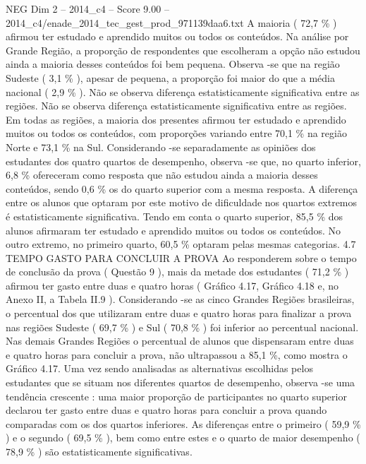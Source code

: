 \begin{textsample}{NEG Dim 2 – 2014\_c4 – Score 9.00 – 2014\_c4/enade\_2014\_tec\_gest\_prod\_971139daa6.txt}
A maioria ( 72,7 \% ) afirmou ter estudado e aprendido muitos ou todos os conteúdos.
Na análise por Grande Região, a proporção de respondentes que escolheram a opção não estudou ainda a maioria desses conteúdos foi bem pequena.
Observa -se que na região Sudeste ( 3,1 \% ), apesar de pequena, a proporção foi maior do que a média nacional ( 2,9 \% ).
Não se observa diferença estatisticamente significativa entre as regiões.
Não se observa diferença estatisticamente significativa entre as regiões.
Em todas as regiões, a maioria dos presentes afirmou ter estudado e aprendido muitos ou todos os conteúdos, com proporções variando entre 70,1 \% na região Norte e 73,1 \% na Sul.
Considerando -se separadamente as opiniões dos estudantes dos quatro quartos de desempenho, observa -se que, no quarto inferior, 6,8 \% ofereceram como resposta que não estudou ainda a maioria desses conteúdos, sendo 0,6 \% os do quarto superior com a mesma resposta.
A diferença entre os alunos que optaram por este motivo de dificuldade nos quartos extremos é estatisticamente significativa.
Tendo em conta o quarto superior, 85,5 \% dos alunos afirmaram ter estudado e aprendido muitos ou todos os conteúdos.
No outro extremo, no primeiro quarto, 60,5 \% optaram pelas mesmas categorias. 4.7 TEMPO GASTO PARA CONCLUIR A PROVA Ao responderem sobre o tempo de conclusão da prova ( Questão 9 ), mais da metade dos estudantes ( 71,2 \% ) afirmou ter gasto entre duas e quatro horas ( Gráfico 4.17, Gráfico 4.18 e, no Anexo II, a Tabela II.9 ).
Considerando -se as cinco Grandes Regiões brasileiras, o percentual dos que utilizaram entre duas e quatro horas para finalizar a prova nas regiões Sudeste ( 69,7 \% ) e Sul ( 70,8 \% ) foi inferior ao percentual nacional.
Nas demais Grandes Regiões o percentual de alunos que dispensaram entre duas e quatro horas para concluir a prova, não ultrapassou a 85,1 \%, como mostra o Gráfico 4.17.
Uma vez sendo analisadas as alternativas escolhidas pelos estudantes que se situam nos diferentes quartos de desempenho, observa -se uma tendência crescente : uma maior proporção de participantes no quarto superior declarou ter gasto entre duas e quatro horas para concluir a prova quando comparadas com os dos quartos inferiores.
As diferenças entre o primeiro ( 59,9 \% ) e o segundo ( 69,5 \% ), bem como entre estes e o quarto de maior desempenho ( 78,9 \% ) são estatisticamente significativas.

\end{textsample}

